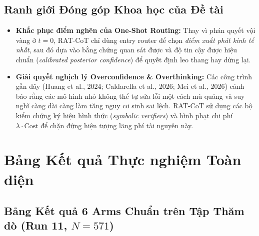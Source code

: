 \documentclass[11pt,a4paper]{report}
\begin{document}
\section{Ranh giới Đóng góp Khoa học của Đề tài}
\begin{itemize}[leftmargin=*]
    \item \textbf{Khắc phục điểm nghẽn của One-Shot Routing:} Thay vì phán quyết vội vàng ở $t=0$, RAT-CoT chỉ dùng entry router để chọn \textit{điểm xuất phát kinh tế nhất}, sau đó dựa vào bằng chứng quan sát được và độ tin cậy được hiệu chuẩn (\textit{calibrated posterior confidence}) để quyết định leo thang hay dừng lại.
    \item \textbf{Giải quyết nghịch lý Overconfidence \& Overthinking:} Các công trình gần đây (Huang et al., 2024; Caldarella et al., 2026; Mei et al., 2026) cảnh báo rằng các mô hình nhỏ không thể tự sửa lỗi một cách mù quáng và suy nghĩ càng dài càng làm tăng nguy cơ sinh sai lệch. RAT-CoT sử dụng các bộ kiểm chứng ký hiệu hình thức (\textit{symbolic verifiers}) và hình phạt chi phí $\lambda \cdot \text{Cost}$ để chặn đứng hiện tượng lãng phí tài nguyên này.
\end{itemize}

\newpage

\chapter{Bảng Kết quả Thực nghiệm Toàn diện}

\section{Bảng Kết quả 6 Arms Chuẩn trên Tập Thăm dò (Run 11, $N=571$)}
\end{document}

